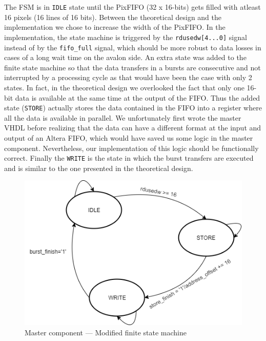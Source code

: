 \documentclass{article}
\begin{document}
The FSM is in \verb'IDLE' state until the PixFIFO (32 x 16-bits) gets filled with atleast 16 pixels (16 lines of 16 bits). Between the theoretical design and the implementation we chose to increase the width of the PixFIFO. In the implementation, the state machine is triggered by the \verb'rdusedw[4...0]' signal instead of by the \verb'fifo_full' signal, which should be more robust to data losses in cases of a long wait time on the avalon side. An extra state was added to the finite state machine so that the data transfers in a bursts are consecutive and not interrupted by a processing cycle as that would have been the case with only 2 states. In fact, in the theoretical design we overlooked the fact that only one 16-bit data is available at the same time at the output of the FIFO. Thus the added state (\verb'STORE') actually stores the data contained in the FIFO into a register where all the data is available in parallel. We unfortunately first wrote the master VHDL before realizing that the data can have a different format at the input and output of an Altera FIFO, which would have saved us some logic in the master component. Nevertheless, our implementation of this logic should be functionally correct. Finally the \verb'WRITE' is the state in which the burst transfers are executed and is similar to the one presented in the theoretical design.

\begin{figure}[H]
\centering
\includegraphics[scale=0.45]{images/MasterFSM.png}
\caption{Master component --- Modified finite state machine}
\label{fig:MasterFSM}
\end{figure}
\end{document}
